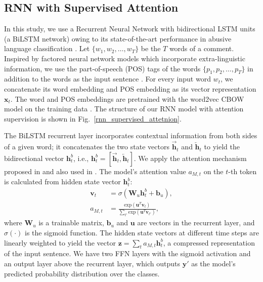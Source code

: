 \documentclass[letterpaper]{article}
\begin{document}
\subsection{RNN with Supervised Attention}
In this study, we use a Recurrent Neural Network with bidirectional LSTM units (a BiLSTM network) owing to its state-of-the-art performance in abusive language classification \cite{chakrabarty2019pay}.
Let  $\{w_{1}, w_{2}, \ldots, w_{T}\}$ be the  $T$ words of a comment.
Inspired by factored neural network models which incorporate extra-linguistic information, we use the part-of-speech (POS) tags of the words  $\{p_{1}, p_{2}, \ldots, p_{T}\}$ in addition to the words as the input sentence \cite{sennrich2016linguistic}.
For every input word $w_{t}$, we concatenate its word embedding and POS embedding as its vector representation $\mathbf{x}_{t}$. The word and POS embeddings are pretrained with the word2vec CBOW model on the training data \cite{mikolov2013distributed}.
The structure of our RNN model with attention supervision is shown in Fig.~\ref{rnn_supervised_attetnion}.


The BiLSTM recurrent layer incorporates contextual information from both sides of a given word; it concatenates the two state vectors $\overrightarrow{\mathbf{h}}_{t}$ and $\overleftarrow{\mathbf{h}}_{t}$ to yield the bidirectional vector $\mathbf{h}^{b}_{t}$, i.e., $\mathbf{h}^{b}_{t}=[\overrightarrow{\mathbf{h}}_{t},\overleftarrow{\mathbf{h}}_{t}]$.
We apply the attention mechanism proposed in \cite{yang2016hierarchical} and also used in \cite{chakrabarty2019pay}. The model's attention value $a_{M,t}$ on the $t$-th token is calculated from hidden state vector $\mathbf{h}^{b}_{t}$:
\begin{align}
\mathbf{v}_{t} &= \sigma(\mathbf{W}_{u}\mathbf{h}^{b}_{t} + \mathbf{b}_{u}), \\
a_{M,t} &= \frac{\text{exp}(\mathbf{u}^{T}\mathbf{v}_{t})}{\sum\limits_{t'}\text{exp}(\mathbf{u}^{T}\mathbf{v}_{t'})},
\end{align}
where $\mathbf{W}_{u}$ is a trainable matrix, $\mathbf{b}_{u}$ and $\mathbf{u}$ are vectors in the recurrent layer, and $\sigma(\cdot)$ is the sigmoid function.
The hidden state vectors at different time steps are linearly weighted to yield the vector $\mathbf{z}=\sum\limits_{t}a_{M,t}\mathbf{h}_{t}^{b}$, a compressed representation of the input sentence. We have two FFN layers with the sigmoid activation and an output layer above the recurrent layer, which  outputs  $\mathbf{y}'$ as the model's predicted probability distribution over the classes.
\end{document}
